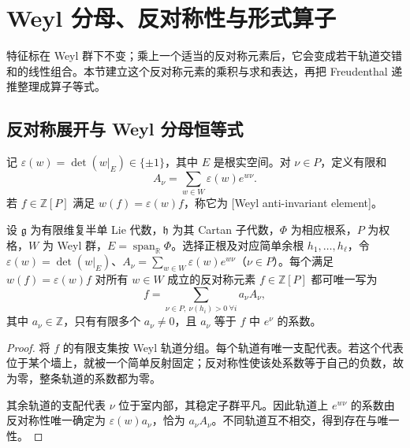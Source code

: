 %
%

\section{Weyl 分母、反对称性与形式算子}
\label{b5:sec:1903}

特征标在 Weyl 群下不变；乘上一个适当的反对称元素后，它会变成若干轨道交错和的线性组合。本节建立这个反对称元素的乘积与求和表达，再把 Freudenthal 递推整理成算子等式。

\subsection{反对称展开与 Weyl 分母恒等式}
\label{b5:subsec:1903:01}

记 \(\varepsilon(w)=\det(w|_E)\in\{\pm1\}\)，其中 \(E\) 是根实空间。对 \(\nu\in P\)，定义有限和
\[
	A_\nu=\sum_{w\in W}\varepsilon(w)e^{w\nu}.
\]
若 \(f\in\mathbb Z[P]\) 满足 \(w(f)=\varepsilon(w)f\)，称它为 [Weyl anti-invariant element]。

\begin{lemma}\label{b5:lem:weyl-alternant-basis}
	设 \(\mathfrak g\) 为有限维复半单 Lie 代数，\(\mathfrak h\) 为其 Cartan 子代数，\(\Phi\) 为相应根系，\(P\) 为权格，\(W\) 为 Weyl 群，\(E=\operatorname{span}_{\mathbb R}\Phi\)。选择正根及对应简单余根 \(h_1,\ldots,h_\ell\)，令 \(\varepsilon(w)=\det(w|_E)\)、\(A_\nu=\sum_{w\in W}\varepsilon(w)e^{w\nu}\)（\(\nu\in P\)）。每个满足 \(w(f)=\varepsilon(w)f\) 对所有 \(w\in W\) 成立的反对称元素 \(f\in\mathbb Z[P]\) 都可唯一写为
	\[
		f=\sum_{\nu\in P,\ \nu(h_i)>0\ \forall i} a_\nu A_\nu,
	\]
	其中 \(a_\nu\in\mathbb Z\)，只有有限多个 \(a_\nu\ne0\)，且 \(a_\nu\) 等于 \(f\) 中 \(e^\nu\) 的系数。
\end{lemma}
\begin{proof}
	将 \(f\) 的有限支集按 Weyl 轨道分组。每个轨道有唯一支配代表。若这个代表位于某个墙上，就被一个简单反射固定；反对称性使该处系数等于自己的负数，故为零，整条轨道的系数都为零。

	其余轨道的支配代表 \(\nu\) 位于室内部，其稳定子群平凡。因此轨道上 \(e^{w\nu}\) 的系数由反对称性唯一确定为 \(\varepsilon(w)a_\nu\)，恰为 \(a_\nu A_\nu\)。不同轨道互不相交，得到存在与唯一性。
\end{proof}

